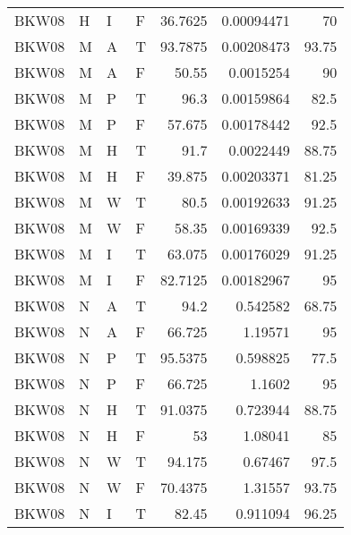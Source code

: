 \begin{longtable}{llllrrr}
    BKW08    & H         & I         & F          & 36.7625    & 0.00094471  & 70       \\
    BKW08    & M         & A         & T          & 93.7875    & 0.00208473  & 93.75    \\
    BKW08    & M         & A         & F          & 50.55      & 0.0015254   & 90       \\
    BKW08    & M         & P         & T          & 96.3       & 0.00159864  & 82.5     \\
    BKW08    & M         & P         & F          & 57.675     & 0.00178442  & 92.5     \\
    BKW08    & M         & H         & T          & 91.7       & 0.0022449   & 88.75    \\
    BKW08    & M         & H         & F          & 39.875     & 0.00203371  & 81.25    \\
    BKW08    & M         & W         & T          & 80.5       & 0.00192633  & 91.25    \\
    BKW08    & M         & W         & F          & 58.35      & 0.00169339  & 92.5     \\
    BKW08    & M         & I         & T          & 63.075     & 0.00176029  & 91.25    \\
    BKW08    & M         & I         & F          & 82.7125    & 0.00182967  & 95       \\
    BKW08    & N         & A         & T          & 94.2       & 0.542582    & 68.75    \\
    BKW08    & N         & A         & F          & 66.725     & 1.19571     & 95       \\
    BKW08    & N         & P         & T          & 95.5375    & 0.598825    & 77.5     \\
    BKW08    & N         & P         & F          & 66.725     & 1.1602      & 95       \\
    BKW08    & N         & H         & T          & 91.0375    & 0.723944    & 88.75    \\
    BKW08    & N         & H         & F          & 53         & 1.08041     & 85       \\
    BKW08    & N         & W         & T          & 94.175     & 0.67467     & 97.5     \\
    BKW08    & N         & W         & F          & 70.4375    & 1.31557     & 93.75    \\
    BKW08    & N         & I         & T          & 82.45      & 0.911094    & 96.25    \\

\end{longtable}
